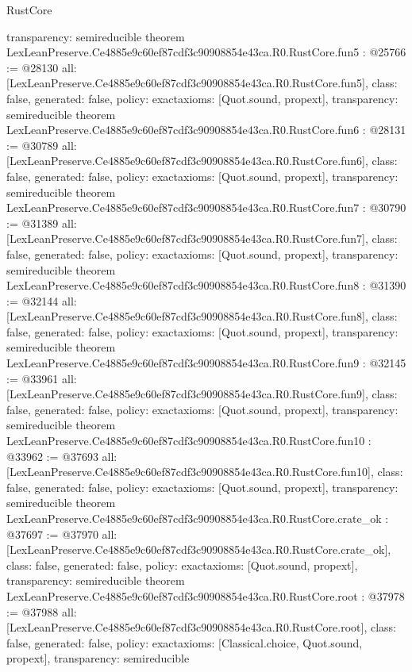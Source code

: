\begin{lexlean}{RustCore}
\begin{coremodule}
{  transparency: semireducible
}
theorem LexLeanPreserve.Ce4885e9c60ef87cdf3c90908854e43ca.R0.RustCore.fun5 : @25766 := @28130 {
  all: [LexLeanPreserve.Ce4885e9c60ef87cdf3c90908854e43ca.R0.RustCore.fun5],
  class: false,
  generated: false,
  policy: exact{axioms: [Quot.sound, propext]},
  transparency: semireducible
}
theorem LexLeanPreserve.Ce4885e9c60ef87cdf3c90908854e43ca.R0.RustCore.fun6 : @28131 := @30789 {
  all: [LexLeanPreserve.Ce4885e9c60ef87cdf3c90908854e43ca.R0.RustCore.fun6],
  class: false,
  generated: false,
  policy: exact{axioms: [Quot.sound, propext]},
  transparency: semireducible
}
theorem LexLeanPreserve.Ce4885e9c60ef87cdf3c90908854e43ca.R0.RustCore.fun7 : @30790 := @31389 {
  all: [LexLeanPreserve.Ce4885e9c60ef87cdf3c90908854e43ca.R0.RustCore.fun7],
  class: false,
  generated: false,
  policy: exact{axioms: [Quot.sound, propext]},
  transparency: semireducible
}
theorem LexLeanPreserve.Ce4885e9c60ef87cdf3c90908854e43ca.R0.RustCore.fun8 : @31390 := @32144 {
  all: [LexLeanPreserve.Ce4885e9c60ef87cdf3c90908854e43ca.R0.RustCore.fun8],
  class: false,
  generated: false,
  policy: exact{axioms: [Quot.sound, propext]},
  transparency: semireducible
}
theorem LexLeanPreserve.Ce4885e9c60ef87cdf3c90908854e43ca.R0.RustCore.fun9 : @32145 := @33961 {
  all: [LexLeanPreserve.Ce4885e9c60ef87cdf3c90908854e43ca.R0.RustCore.fun9],
  class: false,
  generated: false,
  policy: exact{axioms: [Quot.sound, propext]},
  transparency: semireducible
}
theorem LexLeanPreserve.Ce4885e9c60ef87cdf3c90908854e43ca.R0.RustCore.fun10 : @33962 := @37693 {
  all: [LexLeanPreserve.Ce4885e9c60ef87cdf3c90908854e43ca.R0.RustCore.fun10],
  class: false,
  generated: false,
  policy: exact{axioms: [Quot.sound, propext]},
  transparency: semireducible
}
theorem LexLeanPreserve.Ce4885e9c60ef87cdf3c90908854e43ca.R0.RustCore.crate_ok : @37697 := @37970 {
  all: [LexLeanPreserve.Ce4885e9c60ef87cdf3c90908854e43ca.R0.RustCore.crate_ok],
  class: false,
  generated: false,
  policy: exact{axioms: [Quot.sound, propext]},
  transparency: semireducible
}
theorem LexLeanPreserve.Ce4885e9c60ef87cdf3c90908854e43ca.R0.RustCore.root : @37978 := @37988 {
  all: [LexLeanPreserve.Ce4885e9c60ef87cdf3c90908854e43ca.R0.RustCore.root],
  class: false,
  generated: false,
  policy: exact{axioms: [Classical.choice, Quot.sound, propext]},
  transparency: semireducible
}


\end{coremodule}
\end{lexlean}
